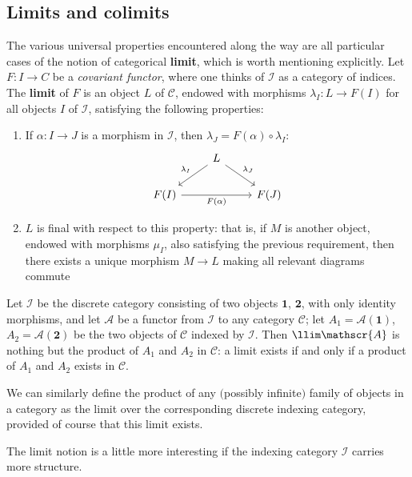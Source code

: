 \subsection{Limits and colimits}
The various universal properties encountered along the way are all particular cases of the notion of categorical \textbf{limit}, which is worth mentioning explicitly. Let $F:I\to C$ be a \textit{covariant functor}, where one thinks of $\mathcal{I}$ as a category of indices. The \textbf{limit} of $F$ is an object $L$ of $\mathcal{C}$, endowed with morphisms $\lambda_I:L\to F(I)$ for all objects $I$ of $\mathcal{I}$, satisfying the
following properties:
\begin{enumerate}
\item If $\alpha:I\to J$ is a morphism in $\mathcal{I}$, then $\lambda_J=F(\alpha)\circ\lambda_I$:
\[\begin{tikzcd}
&L\ar[ld,swap,"\lambda_I"]\ar[rd,"\lambda_J"]&\\
F(I)\ar[rr,swap,"F(\alpha)"]&&F(J)
\end{tikzcd}\]
\item $L$ is final with respect to this property: that is, if $M$ is another object, endowed with morphisms $\mu_I$, also satisfying the previous requirement, then there exists a unique morphism $M\to L$ making all relevant diagrams commute
\end{enumerate}
\begin{example}
Let $\mathcal{I}$ be the discrete category consisting of two objects $\bm{1}$, $\bm{2}$, with only identity morphisms, and let $\mathscr{A}$ be a functor from $\mathcal{I}$ to any category $\mathcal{C}$; let $A_1=\mathscr{A}(\bm{1})$, $A_2=\mathscr{A}(\bm{2})$ be the two objects of $\mathcal{C}$ indexed by $\mathcal{I}$. Then $\llim\mathscr{A}$ is nothing but the product of $A_1$ and $A_2$ in $\mathcal{C}$: a limit exists if and only if a product of $A_1$ and $A_2$ exists in $\mathcal{C}$.\par 
We can similarly define the product of any $($possibly infinite$)$ family of objects in a category as the limit over the corresponding discrete indexing category, provided of course that this limit exists.
\end{example}
The limit notion is a little more interesting if the indexing category $\mathcal{I}$ carries more structure.

